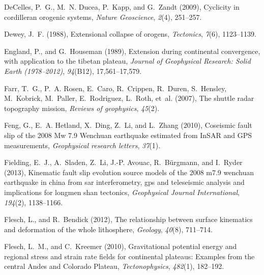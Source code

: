 \documentclass[twocolumn,jgrga]{AGUTeX}
\begin{document}
\begin{article}
{{\begin{thebibliography}{85}
DeCelles, P.~G., M.~N. Ducea, P.~Kapp, and G.~Zandt (2009), Cyclicity in
  cordilleran orogenic systems, \textit{Nature Geoscience}, \textit{2}(4),
  251--257.

Dewey, J.~F. (1988), Extensional collapse of orogens, \textit{Tectonics},
  \textit{7}(6), 1123--1139.

England, P., and G.~Houseman (1989), Extension during continental convergence,
  with application to the tibetan plateau, \textit{Journal of Geophysical
  Research: Solid Earth (1978--2012)}, \textit{94}(B12), 17,561--17,579.

Farr, T.~G., P.~A. Rosen, E.~Caro, R.~Crippen, R.~Duren, S.~Hensley,
  M.~Kobrick, M.~Paller, E.~Rodriguez, L.~Roth, et~al. (2007), The shuttle
  radar topography mission, \textit{Reviews of geophysics}, \textit{45}(2).

Feng, G., E.~A. Hetland, X.~Ding, Z.~Li, and L.~Zhang (2010), Coseismic fault
  slip of the 2008 {M}w 7.9 {W}enchuan earthquake estimated from {I}n{S}{A}{R}
  and {G}{P}{S} measurements, \textit{Geophysical research letters},
  \textit{37}(1).

Fielding, E.~J., A.~Sladen, Z.~Li, J.-P. Avouac, R.~B{\"u}rgmann, and I.~Ryder
  (2013), Kinematic fault slip evolution source models of the 2008 m7.9
  wenchuan earthquake in china from sar interferometry, gps and teleseismic
  analysis and implications for longmen shan tectonics, \textit{Geophysical
  Journal International}, \textit{194}(2), 1138--1166.

Flesch, L., and R.~Bendick (2012), The relationship between surface kinematics
  and deformation of the whole lithosphere, \textit{Geology}, \textit{40}(8),
  711--714.

Flesch, L.~M., and C.~Kreemer (2010), Gravitational potential energy and
  regional stress and strain rate fields for continental plateaus: {E}xamples
  from the central {A}ndes and {C}olorado {P}lateau, \textit{Tectonophysics},
  \textit{482}(1), 182--192.


\end{thebibliography}}}
\end{article}
\end{document}
